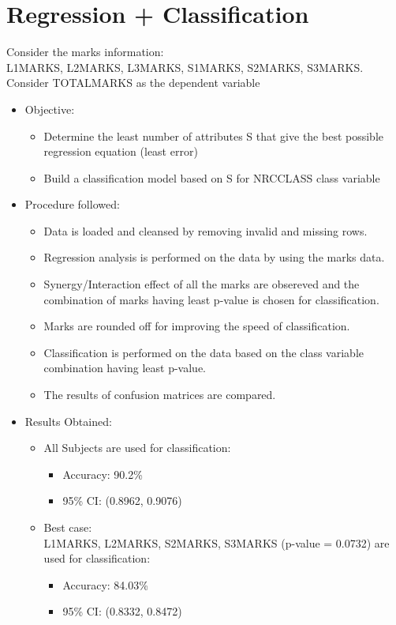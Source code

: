 \chapter{Regression + Classification}
Consider the marks information: \\
L1\textunderscore MARKS, L2\textunderscore MARKS, L3\textunderscore MARKS, S1\textunderscore MARKS, S2\textunderscore MARKS, S3\textunderscore MARKS. Consider TOTAL\textunderscore MARKS as the dependent variable
\begin{itemize}
	\item
	Objective:
	\begin{itemize}
		\item
		Determine the least number of attributes S that give the best possible regression equation (least error)
		\item
		Build a classification model based on S for NRC\textunderscore CLASS class variable
	\end{itemize}
	
	\item
	Procedure followed: 
	\begin{itemize}
		\item
		Data is loaded and cleansed by removing invalid and missing rows.
		\item
		Regression analysis is performed on the data by using the marks data.
		\item
		Synergy/Interaction effect of all the marks are obsereved and the combination of marks having least p-value is chosen for classification.
		\item
		Marks are rounded off for improving the speed of classification.
		\item
		Classification is performed on the data based on the class variable combination having least p-value.
		\item
		The results of confusion matrices are compared.
	\end{itemize}
	
	\item
	Results Obtained:
	\begin{itemize}
		\item
		All Subjects are used for classification:
		\begin{itemize}
			\item
			Accuracy: 90.2\%
			\item
			95\% CI: (0.8962, 0.9076)
		\end{itemize}
		
		\item
		Best case: \\	
		L1\textunderscore MARKS, L2\textunderscore MARKS, S2\textunderscore MARKS, S3\textunderscore MARKS (p-value = 0.0732) are used for classification:
		\begin{itemize}
			\item
			Accuracy: 84.03\%
			\item
			95\% CI: (0.8332, 0.8472)
		\end{itemize}
		

\end{itemize}
\end{itemize}
